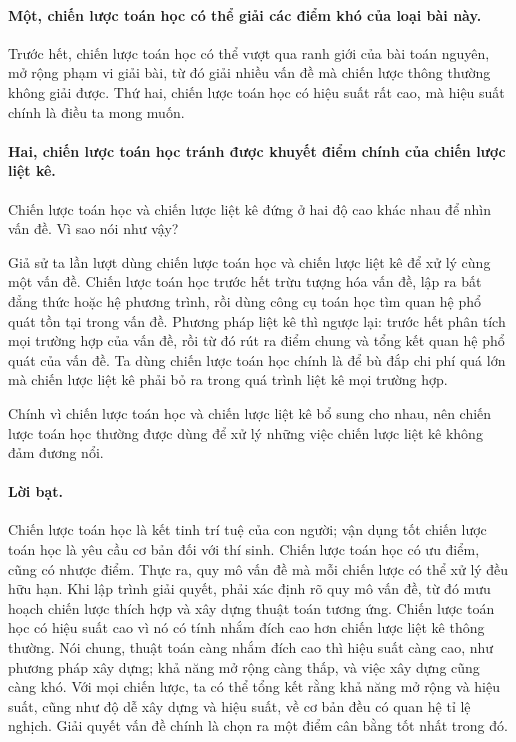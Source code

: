 \documentclass[11pt]{article}
\begin{document}
\paragraph{Một, chiến lược toán học có thể giải các điểm khó của loại bài
này.}
Trước hết, chiến lược toán học có thể vượt qua ranh giới của bài toán nguyên,
mở rộng phạm vi giải bài, từ đó giải nhiều vấn đề mà chiến lược thông thường
không giải được. Thứ hai, chiến lược toán học có hiệu suất rất cao, mà hiệu
suất chính là điều ta mong muốn.

\paragraph{Hai, chiến lược toán học tránh được khuyết điểm chính của chiến
lược liệt kê.}
Chiến lược toán học và chiến lược liệt kê đứng ở hai độ cao khác nhau để nhìn
vấn đề. Vì sao nói như vậy?

Giả sử ta lần lượt dùng chiến lược toán học và chiến lược liệt kê để xử lý
cùng một vấn đề. Chiến lược toán học trước hết trừu tượng hóa vấn đề, lập ra
bất đẳng thức hoặc hệ phương trình, rồi dùng công cụ toán học tìm quan hệ phổ
quát tồn tại trong vấn đề. Phương pháp liệt kê thì ngược lại: trước hết phân
tích mọi trường hợp của vấn đề, rồi từ đó rút ra điểm chung và tổng kết quan
hệ phổ quát của vấn đề. Ta dùng chiến lược toán học chính là để bù đắp chi
phí quá lớn mà chiến lược liệt kê phải bỏ ra trong quá trình liệt kê mọi
trường hợp.

Chính vì chiến lược toán học và chiến lược liệt kê bổ sung cho nhau, nên
chiến lược toán học thường được dùng để xử lý những việc chiến lược liệt kê
không đảm đương nổi.

\paragraph{Lời bạt.}
Chiến lược toán học là kết tinh trí tuệ của con người; vận dụng tốt chiến
lược toán học là yêu cầu cơ bản đối với thí sinh. Chiến lược toán học có ưu
điểm, cũng có nhược điểm. Thực ra, quy mô vấn đề mà mỗi chiến lược có thể xử
lý đều hữu hạn. Khi lập trình giải quyết, phải xác định rõ quy mô vấn đề, từ
đó mưu hoạch chiến lược thích hợp và xây dựng thuật toán tương ứng. Chiến
lược toán học có hiệu suất cao vì nó có tính nhắm đích cao hơn chiến lược
liệt kê thông thường. Nói chung, thuật toán càng nhắm đích cao thì hiệu suất
càng cao, như phương pháp xây dựng; khả năng mở rộng càng thấp, và việc xây
dựng cũng càng khó. Với mọi chiến lược, ta có thể tổng kết rằng khả năng mở
rộng và hiệu suất, cũng như độ dễ xây dựng và hiệu suất, về cơ bản đều có
quan hệ tỉ lệ nghịch. Giải quyết vấn đề chính là chọn ra một điểm cân bằng
tốt nhất trong đó.
\end{document}
